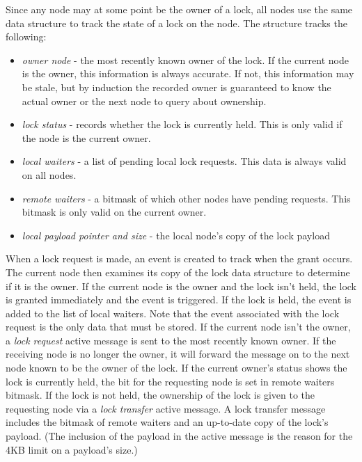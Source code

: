 Since any node may at some point be the owner of a lock, all nodes use the same data structure to track the
state of a lock on the node.
The structure tracks the following:
\begin{itemize} \itemsep1pt \parskip0pt 
\item {\em owner node} - the most recently known owner of the lock.  If the current node is the owner, this
information is always accurate.  If not, this information may be stale, but by induction the recorded 
owner is guaranteed to know the actual owner or the next node to query about ownership.
\item {\em lock status} - records whether the lock is currently held.  This is only valid if the node
is the current owner.
\item {\em local waiters} - a list of pending local lock requests.  This data is always valid on all nodes.
\item {\em remote waiters} - a bitmask of which other nodes have pending requests.  This bitmask is only
valid on the current owner.
\item {\em local payload pointer and size} - the local node's copy of the lock payload
\end{itemize}

When a lock request is made, an event is created to track when the grant occurs.  The current node then
examines its copy of the lock data structure to determine if it is the owner.
If the current node is the owner and the lock isn't
held, the lock is granted immediately and the event is triggered.  If the lock is held, the event is added
to the list of local waiters.  Note that the event associated with
the lock request is the only data that must be stored.
If the current node isn't the owner, a {\em lock request} active message is
sent to the most recently known owner.  If the receiving node is no
longer the owner, it will forward the message on to the next node known
to be the owner of the lock.
If the current owner's status shows
the lock is currently held, the bit for the requesting node is set in remote waiters bitmask.  If the lock is
not held, the ownership of the lock is given to the requesting node via a {\em lock transfer} active
message.  A lock transfer message includes the bitmask of remote waiters and an up-to-date copy 
of the lock's payload.  (The inclusion of the payload in the active message is the reason for the 
4KB limit on a payload's size.)

